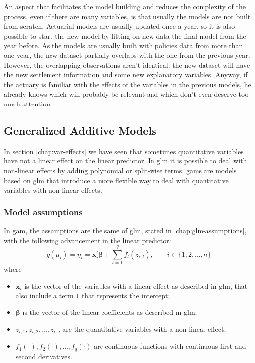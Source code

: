 \documentclass[a4paper, twoside, openright, 12pt]{report}
\providecommand{\tightlist}{%
  \setlength{\itemsep}{0pt}\setlength{\parskip}{0pt}}
\theoremstyle{definition}
\theoremstyle{definition}
\theoremstyle{definition}
\theoremstyle{remark}
\begin{document}
An aspect that facilitates the model building and reduces the complexity of the process, even if there are many variables, is that usually the models are not built from scratch. Actuarial models are usually updated once a year, so it is also possible to start the new model by fitting on new data the final model from the year before. As the models are usually built with policies data from more than one year, the new dataset partially overlaps with the one from the previous year. However, the overlapping observations aren't identical: the new dataset will have the new settlement information and some new explanatory variables. Anyway, if the actuary is familiar with the effects of the variables in the previous models, he already knows which will probably be relevant and which don't even deserve too much attention.

\newpage

\hypertarget{chap:gam}{%
\subsection{Generalized Additive Models}\label{chap:gam}}

In section \ref{chap:var-effects} we have seen that sometimes quantitative variables have not a linear effect on the linear predictor. In \ac{glm} it is possible to deal with non-linear effects by adding polynomial or split-wise terms. \ac{gam}s are models based on \ac{glm} that introduce a more flexible way to deal with quantitative variables with non-linear effects.

\hypertarget{model-assumptions}{%
\subsubsection{Model assumptions}\label{model-assumptions}}

In \ac{gam}, the assumptions are the same of \ac{glm}, stated in \ref{chap:glm-assumptions}, with the following advancement in the linear predictor:
\[
g(\mu_i) = \eta_i = \boldsymbol{x}_i^t \boldsymbol{\beta} + \sum_{l=1}^{q}{f_l(z_{i,l})}, \qquad i\in\{1,2,\dots,n\}
\]
where

\begin{itemize}
\tightlist
\item
  \(\boldsymbol{x}_i\) is the vector of the variables with a linear effect as described in \ac{glm}, that also include a term \(1\) that represents the intercept;
\item
  \(\boldsymbol{\beta}\) is the vector of the linear coefficients as described in \ac{glm};
\item
  \(z_{i,1}, z_{i,2}, \dots, z_{i,q}\) are the quantitative variables with a non linear effect;
\item
  \(f_1(\cdot), f_2(\cdot), \dots, f_q(\cdot)\) are continuous functions with continuous first and second derivatives.
\end{itemize}
\end{document}
